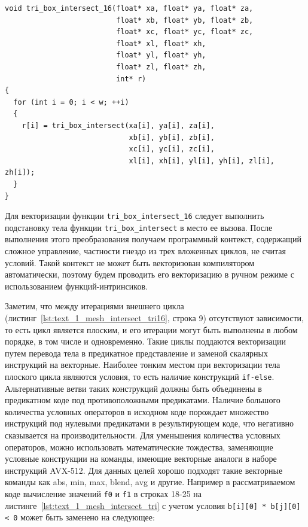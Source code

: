 \begin{lstlisting}[caption={Исходная реализация функции, объединяющей 16 вызовов функции \texttt{tri\_box\_intersect}.},label={lst:text_1_mesh_intersect_tri16}]
void tri_box_intersect_16(float* xa, float* ya, float* za,
                          float* xb, float* yb, float* zb,
                          float* xc, float* yc, float* zc,
                          float* xl, float* xh,
                          float* yl, float* yh,
                          float* zl, float* zh,
                          int* r)
{
  for (int i = 0; i < w; ++i)
  {
    r[i] = tri_box_intersect(xa[i], ya[i], za[i],
                             xb[i], yb[i], zb[i],
                             xc[i], yc[i], zc[i],
                             xl[i], xh[i], yl[i], yh[i], zl[i], zh[i]);
  }
}
\end{lstlisting}

Для векторизации функции \texttt{tri\_box\_intersect\_16} следует выполнить подстановку тела функции \texttt{tri\_box\_intersect} в место ее вызова.
После выполнения этого преобразования получаем программный контекст, содержащий сложное управление, частности гнездо из трех вложенных циклов, не считая условий.
Такой контекст не может быть векторизован компилятором автоматически, поэтому будем проводить его векторизацию в ручном режиме с использованием функций-интринсиков.

Заметим, что между итерациями внешнего цикла (листинг~\ref{lst:text_1_mesh_intersect_tri16}, строка 9) отсутствуют зависимости, то есть цикл является плоским, и его итерации могут быть выполнены в любом порядке, в том числе и одновременно.
Такие циклы поддаются векторизации путем перевода тела в предикатное представление и заменой скалярных инструкций на векторные.
Наиболее тонким местом при векторизации тела плоского цикла являются условия, то есть наличие конструкций \texttt{if-else}.
Альтернативные ветви таких конструкций должны быть объединены в предикатном коде под противоположными предикатами.
Наличие большого количества условных операторов в исходном коде порождает множество инструкций под нулевыми предикатами в результирующем коде, что негативно сказывается на производительности.
Для уменьшения количества условных операторов, можно использовать математические тождества, заменяющие условные конструкции на команды, имеющие векторные аналоги в наборе инструкций AVX-512.
Для данных целей хорошо подходят такие векторные команды как abs, min, max, blend, avg и другие.
Например в рассматриваемом коде вычисление значений \texttt{f0} и \texttt{f1} в строках 18-25 на листинге~\ref{lst:text_1_mesh_intersect_tri} с учетом условия \texttt{b[i][0] * b[j][0] < 0} может быть заменено на следующее:

